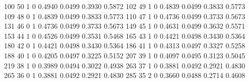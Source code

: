 \documentclass[
  12pt,
  letterpaper,
  DIV=11,
  numbers=noendperiod,
  onepage,
  openany]{scrreprt}
\newenvironment{Shaded}{\begin{snugshade}}{\end{snugshade}}
\newcommand{\DecValTok}[1]{\textcolor[rgb]{0.86,0.86,0.80}{#1}}
\newcommand{\FloatTok}[1]{\textcolor[rgb]{0.75,0.75,0.82}{#1}}
\begin{document}
\begin{Shaded}
\begin{Highlighting}[]
   \DecValTok{100}       \DecValTok{50}      \DecValTok{1}      \DecValTok{0}             \FloatTok{0.4940}    \FloatTok{0.0499}     \FloatTok{0.3930}    \FloatTok{0.5872}
   \DecValTok{102}       \DecValTok{49}      \DecValTok{1}      \DecValTok{0}             \FloatTok{0.4839}    \FloatTok{0.0499}     \FloatTok{0.3833}    \FloatTok{0.5773}
   \DecValTok{109}       \DecValTok{48}      \DecValTok{0}      \DecValTok{1}             \FloatTok{0.4839}    \FloatTok{0.0499}     \FloatTok{0.3833}    \FloatTok{0.5773}
   \DecValTok{110}       \DecValTok{47}      \DecValTok{1}      \DecValTok{0}             \FloatTok{0.4736}    \FloatTok{0.0499}     \FloatTok{0.3733}    \FloatTok{0.5673}
   \DecValTok{131}       \DecValTok{46}      \DecValTok{0}      \DecValTok{1}             \FloatTok{0.4736}    \FloatTok{0.0499}     \FloatTok{0.3733}    \FloatTok{0.5673}
   \DecValTok{149}       \DecValTok{45}      \DecValTok{1}      \DecValTok{0}             \FloatTok{0.4631}    \FloatTok{0.0499}     \FloatTok{0.3632}    \FloatTok{0.5571}
   \DecValTok{153}       \DecValTok{44}      \DecValTok{1}      \DecValTok{0}             \FloatTok{0.4526}    \FloatTok{0.0499}     \FloatTok{0.3531}    \FloatTok{0.5468}
   \DecValTok{165}       \DecValTok{43}      \DecValTok{1}      \DecValTok{0}             \FloatTok{0.4421}    \FloatTok{0.0498}     \FloatTok{0.3430}    \FloatTok{0.5364}
   \DecValTok{180}       \DecValTok{42}      \DecValTok{0}      \DecValTok{1}             \FloatTok{0.4421}    \FloatTok{0.0498}     \FloatTok{0.3430}    \FloatTok{0.5364}
   \DecValTok{186}       \DecValTok{41}      \DecValTok{1}      \DecValTok{0}             \FloatTok{0.4313}    \FloatTok{0.0497}     \FloatTok{0.3327}    \FloatTok{0.5258}
   \DecValTok{188}       \DecValTok{40}      \DecValTok{1}      \DecValTok{0}             \FloatTok{0.4205}    \FloatTok{0.0497}     \FloatTok{0.3225}    \FloatTok{0.5152}
   \DecValTok{207}       \DecValTok{39}      \DecValTok{1}      \DecValTok{0}             \FloatTok{0.4097}    \FloatTok{0.0495}     \FloatTok{0.3123}    \FloatTok{0.5045}
   \DecValTok{219}       \DecValTok{38}      \DecValTok{1}      \DecValTok{0}             \FloatTok{0.3989}    \FloatTok{0.0494}     \FloatTok{0.3022}    \FloatTok{0.4938}
   \DecValTok{263}       \DecValTok{37}      \DecValTok{1}      \DecValTok{0}             \FloatTok{0.3881}    \FloatTok{0.0492}     \FloatTok{0.2921}    \FloatTok{0.4830}
   \DecValTok{265}       \DecValTok{36}      \DecValTok{0}      \DecValTok{1}             \FloatTok{0.3881}    \FloatTok{0.0492}     \FloatTok{0.2921}    \FloatTok{0.4830}
   \DecValTok{285}       \DecValTok{35}      \DecValTok{2}      \DecValTok{0}             \FloatTok{0.3660}    \FloatTok{0.0488}     \FloatTok{0.2714}    \FloatTok{0.4608}

\end{Highlighting}
\end{Shaded}
\end{document}
